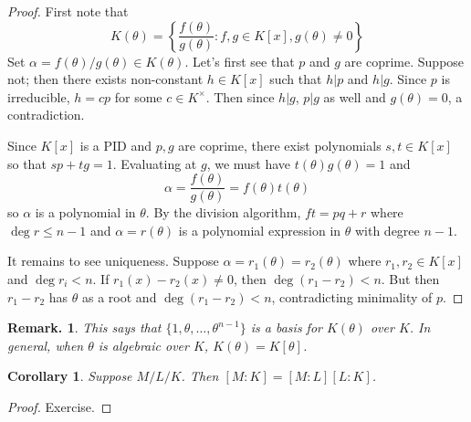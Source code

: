 \documentclass[11pt, a4paper]{memoir}
\theoremstyle{change}
\newtheorem{corollary}[theorem]{Corollary}
\theoremstyle{plain}
\theoremstyle{nonumberplain}
\newtheorem{remark}{Remark.}
\newtheorem{proof}{Proof}
\begin{document}
\begin{proof}
    First note that
    \begin{equation*}K(\theta)=\left\{\frac{f(\theta)}{g(\theta)}: f,g\in K[x],g(\theta)\neq 0\right\}\end{equation*}
    Set $\alpha=f(\theta)/g(\theta)\in K(\theta)$.
    Let's first see that $p$ and $g$ are coprime.
    Suppose not; then there exists non-constant $h\in K[x]$ such that $h|p$ and $h|g$.
    Since $p$ is irreducible, $h=cp$ for some $c\in K^\times$.
    Then since $h|g$, $p|g$ as well and $g(\theta)=0$, a contradiction.

    Since $K[x]$ is a PID and $p,g$ are coprime, there exist polynomials $s,t\in K[x]$ so that $sp+tg=1$.
    Evaluating at $g$, we must have $t(\theta)g(\theta)=1$ and
    \begin{equation*}
        \alpha=\frac{f(\theta)}{g(\theta)}=f(\theta)t(\theta)
    \end{equation*}
    so $\alpha$ is a polynomial in $\theta$.
    By the division algorithm, $ft=pq+r$ where $\deg r\leq n-1$ and $\alpha=r(\theta)$ is a polynomial expression in $\theta$ with degree $n-1$.

    It remains to see uniqueness.
    Suppose $\alpha=r_1(\theta)=r_2(\theta)$ where $r_1,r_2\in K[x]$ and $\deg r_i<n$.
    If $r_1(x)-r_2(x)\neq 0$, then $\deg(r_1-r_2)<n$.
    But then $r_1-r_2$ has $\theta$ as a root and $\deg(r_1-r_2)<n$, contradicting minimality of $p$.
\end{proof}
\begin{remark}
    This says that $\{1,\theta,\ldots,\theta^{n-1}\}$ is a basis for $K(\theta)$ over $K$.
    In general, when $\theta$ is algebraic over $K$, $K(\theta)=K[\theta]$.
\end{remark}
\begin{corollary}
    Suppose $M/L/K$.
    Then $[M:K]=[M:L][L:K]$.
\end{corollary}
\begin{proof}
    Exercise.
\end{proof}
\end{document}
